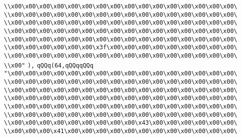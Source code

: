\verb|\\x00\x00\x00\x00\x00\x00\x00\x00\x00\x00\x00\x00\x00\x00\x00\x00\|\newline
\verb|\\x00\x00\x00\x00\x00\x00\x00\x00\x00\x00\x00\x00\x00\x00\x00\x00\|\newline
\verb|\\x00\x00\x00\x00\x00\x00\x00\x00\x00\x00\x00\x00\x00\x00\x00\x00\|\newline
\verb|\\x00\x00\x00\x00\x00\x00\x00\x00\x00\x00\x00\x00\x00\x00\x00\x00\|\newline
\verb|\\x00\x00\x00\x00\x00\x00\x00\x00\x00\x00\x00\x00\x00\x00\x00\x00\|\newline
\verb|\\x00\x00\x00\x00\x00\x00\x3f\x00\x00\x00\x00\x00\x00\x00\x00\x00\|\newline
\verb|\\x00\x00\x00\x00\x00\x00\x00\x00\x00\x00\x00\x00\x00\x00\x00\x00\|\newline
\verb|\\x00"|\newline
\verb|),|\newline
\verb|qQQq(64,qQQqqQQq|\newline
\verb|"\x00\x00\x00\x00\x00\x00\x00\x00\x00\x00\x00\x00\x00\x00\x00\x00\|\newline
\verb|\\x00\x00\x00\x00\x00\x00\x00\x00\x00\x00\x00\x00\x00\x00\x00\x00\|\newline
\verb|\\x00\x00\x00\x00\x00\x00\x00\x00\x00\x00\x00\x00\x00\x00\x00\x00\|\newline
\verb|\\x00\x00\x00\x00\x00\x00\x00\x00\x00\x00\x00\x00\x00\x00\x00\x00\|\newline
\verb|\\x00\x00\x00\x00\x00\x00\x00\x00\x00\x00\x00\x00\x00\x00\x00\x00\|\newline
\verb|\\x00\x00\x00\x00\x00\x00\x00\x00\x00\x00\x00\x00\x00\x00\x00\x00\|\newline
\verb|\\x00\x00\x00\x00\x00\x00\x00\x00\x00\x43\x00\x00\x00\x00\x00\x00\|\newline
\verb|\\x00\x00\x00\x41\x00\x00\x00\x00\x00\x00\x00\x00\x00\x00\x00\x00\|\newline
